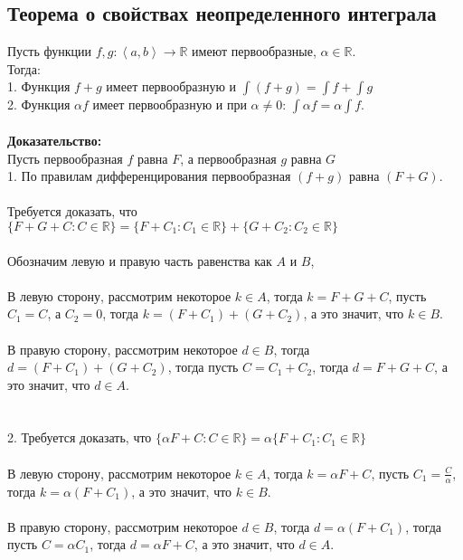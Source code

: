 \documentclass[../main.tex]{subfiles}
\begin{document}
\subsection{Теорема о свойствах неопределенного интеграла}
Пусть функции $f, g: \left \langle a, b \right \rangle \to \mathbb{R}$ имеют первообразные, $\alpha \in \mathbb{R}$. \\
Тогда: \\
1. Функция $f + g$ имеет первообразную и $\int (f + g) = \int f + \int g$ \\
2. Функция $\alpha f $ имеет первообразную и при $\alpha \neq 0 $: $ \int \alpha f = \alpha \int f$. \\\\
\textbf{Доказательство:} \\
Пусть первообразная $f$ равна $F$, а первообразная $g$ равна $G$ \\
1. По правилам дифференцирования первообразная $(f + g)$ равна $(F + G)$. \\\\
Требуется доказать, что $\{F + G + C : C \in \mathbb{R} \} = \{F + C_1 : C_1 \in \mathbb{R} \} + \{G + C_2 : C_2 \in \mathbb{R} \}$ \\\\
Обозначим левую и правую часть равенства как $A$ и $B$, \\\\
В левую сторону, рассмотрим некоторое $k \in A$, тогда $k = F + G + C$, пусть $C_1 = C$, а $C_2 = 0$, тогда $k = (F + C_1) + (G + C_2)$, а это значит, что $k \in B$. \\\\
В правую сторону, рассмотрим некоторое $d \in B$, тогда $d = (F + C_1) + (G + C_2)$, тогда пусть $C = C_1 + C_2$, тогда $d = F + G + C$, а это значит, что $d \in A$.\\\\\\
2. Требуется доказать, что $\{\alpha F + C : C \in \mathbb{R} \} = \alpha \{F + C_1 : C_1 \in \mathbb{R} \}$ \\\\
В левую сторону, рассмотрим некоторое $k \in A$, тогда $k = \alpha F + C$, пусть $C_1 = \frac{C}{\alpha}$, тогда $k = \alpha (F + C_1)$, а это значит, что $k \in B$. \\\\
В правую сторону, рассмотрим некоторое $d \in B$, тогда $d = \alpha (F + C_1)$, тогда пусть $C = \alpha C_1 $, тогда $d = \alpha F + C$, а это значит, что $d \in A$.
\end{document}
